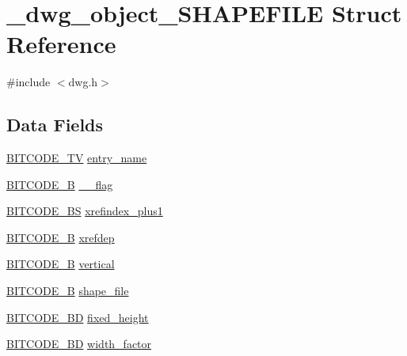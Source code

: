 \hypertarget{struct__dwg__object__SHAPEFILE}{\section{\-\_\-dwg\-\_\-object\-\_\-\-S\-H\-A\-P\-E\-F\-I\-L\-E \-Struct \-Reference}
\label{struct__dwg__object__SHAPEFILE}
}


{\ttfamily \#include $<$dwg.\-h$>$}

\subsection*{\-Data \-Fields}
\begin{DoxyCompactItemize}
\item 
\hyperlink{dwg_8h_a2a7e040c6e36ca039b03608679ecaf7c}{\-B\-I\-T\-C\-O\-D\-E\-\_\-\-T\-V} \hyperlink{struct__dwg__object__SHAPEFILE_aa1fc35454d78a45bda1d7363dd54c58c}{entry\-\_\-name}
\item 
\hyperlink{dwg_8h_ab533b1f62d9086749e3bb5b67e9f224e}{\-B\-I\-T\-C\-O\-D\-E\-\_\-\-B} \hyperlink{struct__dwg__object__SHAPEFILE_a10d2965af135304164e1b6fbfca947b0}{\-\_\-\_\-flag}
\item 
\hyperlink{dwg_8h_a94297606fbd4a4ff97e8add284af0809}{\-B\-I\-T\-C\-O\-D\-E\-\_\-\-B\-S} \hyperlink{struct__dwg__object__SHAPEFILE_a05a64876d7e9aa9d35fd9fc1b3a71355}{xrefindex\-\_\-plus1}
\item 
\hyperlink{dwg_8h_ab533b1f62d9086749e3bb5b67e9f224e}{\-B\-I\-T\-C\-O\-D\-E\-\_\-\-B} \hyperlink{struct__dwg__object__SHAPEFILE_aa286a58082b72a58083aca0f24c0a131}{xrefdep}
\item 
\hyperlink{dwg_8h_ab533b1f62d9086749e3bb5b67e9f224e}{\-B\-I\-T\-C\-O\-D\-E\-\_\-\-B} \hyperlink{struct__dwg__object__SHAPEFILE_ac3d325e110bc902cf1501a2296a3cf20}{vertical}
\item 
\hyperlink{dwg_8h_ab533b1f62d9086749e3bb5b67e9f224e}{\-B\-I\-T\-C\-O\-D\-E\-\_\-\-B} \hyperlink{struct__dwg__object__SHAPEFILE_a72769685e5e43eaa9ae2673373f910b7}{shape\-\_\-file}
\item 
\hyperlink{dwg_8h_a3c1e6781466b74ba07785d57da70ed97}{\-B\-I\-T\-C\-O\-D\-E\-\_\-\-B\-D} \hyperlink{struct__dwg__object__SHAPEFILE_a12bb945547023e6c49acb0472ec65dbb}{fixed\-\_\-height}
\item 
\hyperlink{dwg_8h_a3c1e6781466b74ba07785d57da70ed97}{\-B\-I\-T\-C\-O\-D\-E\-\_\-\-B\-D} \hyperlink{struct__dwg__object__SHAPEFILE_a47e996a6e1d96c660e51c88c9db6e379}{width\-\_\-factor}

\end{DoxyCompactItemize}
